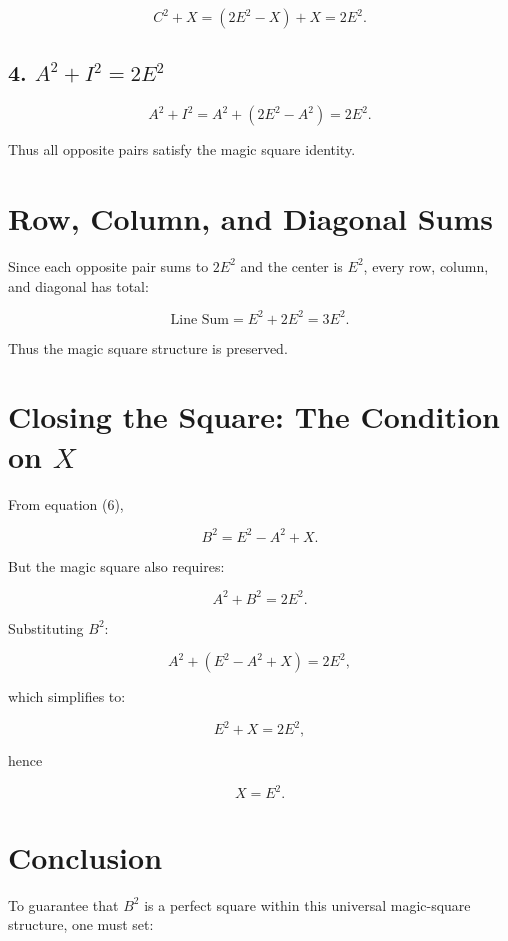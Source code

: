 \documentclass[12pt]{article}
\begin{document}
\[
C^2 + X = (2E^2 - X) + X = 2E^2.
\]



\subsection*{4. $A^2 + I^2 = 2E^2$}



\[
A^2 + I^2 = A^2 + (2E^2 - A^2) = 2E^2.
\]



Thus all opposite pairs satisfy the magic square identity.

\section*{Row, Column, and Diagonal Sums}

Since each opposite pair sums to $2E^2$ and the center is $E^2$, every row, column, and diagonal has total:



\[
\text{Line Sum} = E^2 + 2E^2 = 3E^2.
\]



Thus the magic square structure is preserved.

\section*{Closing the Square: The Condition on $X$}

From equation (6),


\[
B^2 = E^2 - A^2 + X.
\]



But the magic square also requires:


\[
A^2 + B^2 = 2E^2.
\]



Substituting $B^2$:


\[
A^2 + (E^2 - A^2 + X) = 2E^2,
\]


which simplifies to:


\[
E^2 + X = 2E^2,
\]


hence


\[
X = E^2.
\]



\section*{Conclusion}

To guarantee that $B^2$ is a perfect square within this universal magic-square structure, one must set:
\end{document}
